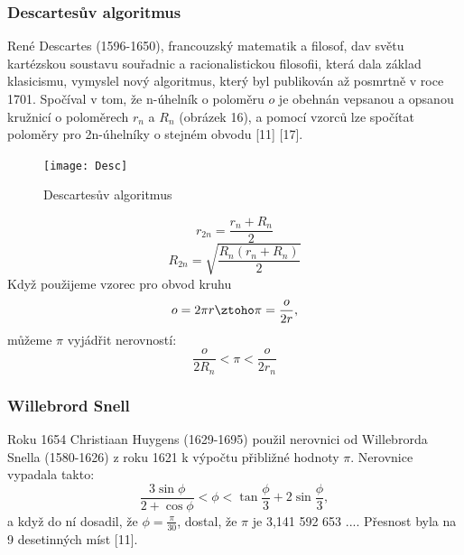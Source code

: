 \documentclass[rocnikovka]{gzwroc} %
\begin{document}
\subsubsection{Descartesův algoritmus}
René Descartes (1596-1650), francouzský matematik a filosof, dav světu kartézskou soustavu souřadnic a racionalistickou filosofii, která dala základ klasicismu, vymyslel nový algoritmus, který byl publikován až posmrtně v roce 1701. Spočíval v tom, že n-úhelník o poloměru $o$ je obehnán vepsanou a opsanou kružnicí o poloměrech $r_n$ a $R_n$ (obrázek 16), a pomocí vzorců lze spočítat poloměry pro 2n-úhelníky o stejném obvodu [11] [17].
\begin{figure}[!ht]
\texttt{[image: Desc]}
\caption{Descartesův algoritmus}
\label{fig:kruh}
\end{figure}
\begin{equation}
r_{2n}=\frac{r_n+R_n}{2}
\end{equation}
\begin{equation}
R_{2n}=\sqrt{\frac{R_n(r_n+R_n)}{2}}
\end{equation}
Když použijeme vzorec pro obvod kruhu
$$
o=2\pi r \ztoho \pi=\frac{o}{2r},
$$
můžeme $\pi$ vyjádřit nerovností:
\begin{equation}
\frac{o}{2R_n}<\pi<\frac{o}{2r_n}
\end{equation}

\subsubsection{Willebrord Snell}
Roku 1654 Christiaan Huygens (1629-1695) použil nerovnici od Willebrorda Snella (1580-1626) z roku 1621 k výpočtu přibližné hodnoty $\pi$. Nerovnice vypadala takto:
\begin{equation}
\frac{3\sin\phi}{2+\cos\phi}<\phi<\tan\frac{\phi}{3}+2\sin\frac{\phi}{3},
\end{equation}
a když do ní dosadil, že $\phi  = \frac{\pi}{30}$, dostal, že $\pi$ je 3,141 592 653 .... Přesnost byla na 9 desetinných míst [11].
\end{document}
